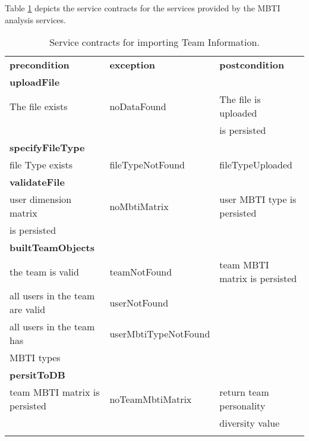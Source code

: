 Table \ref{tab:teaminfoimport} depicts the service contracts for the services provided by the MBTI analysis services.

\begin{table}[htb]
\caption{Service contracts for importing Team Information. \label{tab:teaminfoimport}}

\begin{tabular}{l l l}
\hline
\noalign{\smallskip}
\textbf{precondition}&\textbf{exception} &\textbf{postcondition}\\
\noalign{\smallskip}
\hline
\noalign{\smallskip}
\textbf{uploadFile}\\
The file exists & noDataFound & The file is uploaded \\
&&is persisted \\
\noalign{\smallskip}
\textbf{specifyFileType}\\
file Type exists & fileTypeNotFound & fileTypeUploaded\\
\noalign{\smallskip}

\textbf{validateFile}\\
user dimension matrix & noMbtiMatrix & user MBTI type is persisted\\
is persisted \\

\noalign{\smallskip}
\textbf{builtTeamObjects} \\
the team is valid & teamNotFound & team MBTI matrix is persisted \\
all users in the team are valid & userNotFound\\
all users in the team has & userMbtiTypeNotFound\\
MBTI types \\
\noalign{\smallskip}
\textbf{persitToDB}\\
team MBTI matrix is persisted & noTeamMbtiMatrix & return team personality \\
&&diversity value\\
\noalign{\smallskip}
\hline
\end{tabular}  
\end{table}
 